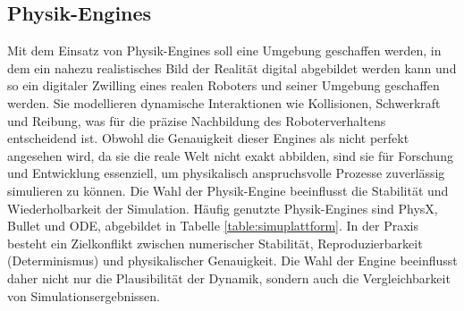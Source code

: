\subsection{Physik-Engines}
Mit dem Einsatz von Physik-Engines soll eine Umgebung geschaffen werden, in
dem ein nahezu realistisches Bild der Realität digital abgebildet werden kann
und so ein digitaler Zwilling eines realen Roboters und seiner Umgebung
geschaffen werden. Sie modellieren dynamische Interaktionen wie Kollisionen,
Schwerkraft und Reibung, was für die präzise Nachbildung des Roboterverhaltens
entscheidend ist. Obwohl die Genauigkeit dieser Engines als nicht perfekt
angesehen wird, da sie die reale Welt nicht exakt
abbilden, sind sie für
Forschung und Entwicklung essenziell, um physikalisch anspruchsvolle Prozesse
zuverlässig simulieren zu können. Die Wahl der Physik-Engine
beeinflusst die Stabilität und Wiederholbarkeit der
Simulation. Häufig genutzte Physik-Engines sind PhysX, Bullet und
ODE, abgebildet in
Tabelle \ref{table:simuplattform}. In der Praxis besteht ein
Zielkonflikt zwischen numerischer Stabilität,
Reproduzierbarkeit (Determinismus) und physikalischer Genauigkeit. Die Wahl der
Engine beeinflusst daher nicht nur die Plausibilität der Dynamik, sondern auch
die Vergleichbarkeit von Simulationsergebnissen.

